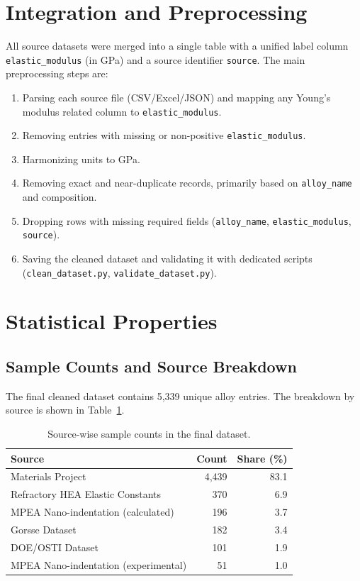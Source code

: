 \documentclass[12pt]{article}
\begin{document}
\section{Integration and Preprocessing}
All source datasets were merged into a single table with a unified label column \texttt{elastic\_modulus} (in GPa) and a source identifier \texttt{source}. The main preprocessing steps are:
\begin{enumerate}
  \item Parsing each source file (CSV/Excel/JSON) and mapping any Young's modulus related column to \texttt{elastic\_modulus}.
  \item Removing entries with missing or non-positive \texttt{elastic\_modulus}.
  \item Harmonizing units to GPa.
  \item Removing exact and near-duplicate records, primarily based on \texttt{alloy\_name} and composition.
  \item Dropping rows with missing required fields (\texttt{alloy\_name}, \texttt{elastic\_modulus}, \texttt{source}).
  \item Saving the cleaned dataset and validating it with dedicated scripts (\texttt{clean\_dataset.py}, \texttt{validate\_dataset.py}).
\end{enumerate}

\section{Statistical Properties}
\subsection{Sample Counts and Source Breakdown}
The final cleaned dataset contains 5,339 unique alloy entries. The breakdown by source is shown in Table~\ref{tab:sources}.

\begin{table}[h]
  \centering
  \caption{Source-wise sample counts in the final dataset.}
  \label{tab:sources}
  \begin{tabular}{lrr}
    \toprule
    Source & Count & Share (\%) \\
    \midrule
    Materials Project & 4,439 & 83.1 \\
    Refractory HEA Elastic Constants & 370 & 6.9 \\
    MPEA Nano-indentation (calculated) & 196 & 3.7 \\
    Gorsse Dataset & 182 & 3.4 \\
    DOE/OSTI Dataset & 101 & 1.9 \\
    MPEA Nano-indentation (experimental) & 51 & 1.0 \\
    \bottomrule
  \end{tabular}
\end{table}
\end{document}
